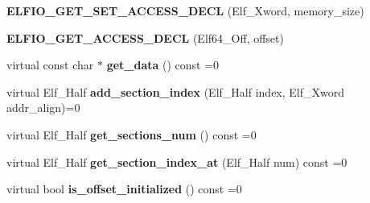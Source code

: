 \begin{DoxyCompactItemize}
\item 
{\bfseries E\+L\+F\+I\+O\+\_\+\+G\+E\+T\+\_\+\+S\+E\+T\+\_\+\+A\+C\+C\+E\+S\+S\+\_\+\+D\+E\+CL} (Elf\+\_\+\+Xword, memory\+\_\+size)\hypertarget{class_e_l_f_i_o_1_1segment_a6f39ae43ac4a71c644eb18a33e550c72}{}\label{class_e_l_f_i_o_1_1segment_a6f39ae43ac4a71c644eb18a33e550c72}

\item 
{\bfseries E\+L\+F\+I\+O\+\_\+\+G\+E\+T\+\_\+\+A\+C\+C\+E\+S\+S\+\_\+\+D\+E\+CL} (Elf64\+\_\+\+Off, offset)\hypertarget{class_e_l_f_i_o_1_1segment_ada4b8fc7c283478e36c73b6a04a39963}{}\label{class_e_l_f_i_o_1_1segment_ada4b8fc7c283478e36c73b6a04a39963}

\item 
virtual const char $\ast$ {\bfseries get\+\_\+data} () const =0\hypertarget{class_e_l_f_i_o_1_1segment_a0e7c9e9da5d1df20f62117fd93607ddf}{}\label{class_e_l_f_i_o_1_1segment_a0e7c9e9da5d1df20f62117fd93607ddf}

\item 
virtual Elf\+\_\+\+Half {\bfseries add\+\_\+section\+\_\+index} (Elf\+\_\+\+Half index, Elf\+\_\+\+Xword addr\+\_\+align)=0\hypertarget{class_e_l_f_i_o_1_1segment_ab9dad348857c6f427ae53fddda0df4cd}{}\label{class_e_l_f_i_o_1_1segment_ab9dad348857c6f427ae53fddda0df4cd}

\item 
virtual Elf\+\_\+\+Half {\bfseries get\+\_\+sections\+\_\+num} () const =0\hypertarget{class_e_l_f_i_o_1_1segment_a33d8e5585047fcf3383e54d53b40e777}{}\label{class_e_l_f_i_o_1_1segment_a33d8e5585047fcf3383e54d53b40e777}

\item 
virtual Elf\+\_\+\+Half {\bfseries get\+\_\+section\+\_\+index\+\_\+at} (Elf\+\_\+\+Half num) const =0\hypertarget{class_e_l_f_i_o_1_1segment_a79bbf4effbd428b14bab843251390034}{}\label{class_e_l_f_i_o_1_1segment_a79bbf4effbd428b14bab843251390034}

\item 
virtual bool {\bfseries is\+\_\+offset\+\_\+initialized} () const =0\hypertarget{class_e_l_f_i_o_1_1segment_ab800bc9c9c6c586905cf893f9843d924}{}\label{class_e_l_f_i_o_1_1segment_ab800bc9c9c6c586905cf893f9843d924}

\end{DoxyCompactItemize}
